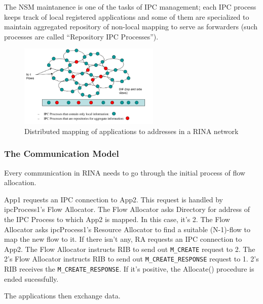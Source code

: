                 The NSM maintanence is one of the tasks of IPC management; each IPC process keeps track of local registered applications and some of them are specialized to maintain aggregated repository of non-local mapping to serve as forwarders (such processes are called ``Repository IPC Processes'').

                \begin{figure}[H]
                    \begin{center}
                        \includegraphics[width=0.6\textwidth]{fig/archs_rina-nsm.png}
                      \caption{Distributed mapping of applications to addresses in a RINA network}
                      \label{fig:rina_nsm}
                    \end{center}
                \end{figure}


            \subsubsection{The Communication Model}

                Every communication in RINA needs to go through the initial process of flow allocation.

                App1 requests an IPC connection to App2. This request is handled by ipcProcess1's Flow Allocator.
                The Flow Allocator asks Directory for address of the IPC Process to which App2 is mapped. In this case, it's 2.
                The Flow Allocator asks ipcProcess1's Resource Allocator to find a suitable (N-1)-flow to map the new flow to it. If there isn't any, RA requests an IPC connection to App2.
                The Flow Allocator instructs RIB to send out \texttt{M\_CREATE} request to 2.
                The 2's Flow Allocator instructs RIB to send out \texttt{M\_CREATE\_RESPONSE} request to 1.
                2's RIB receives the \texttt{M\_CREATE\_RESPONSE}. If it's positive, the Allocate() procedure is ended sucessfully.

                The applications then exchange data.


